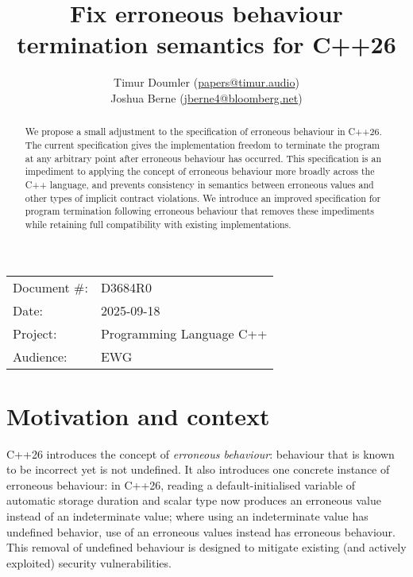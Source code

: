 

 \usepackage[bottom]{footmisc} 



\title{Fix erroneous behaviour termination semantics for C++26}
\author{
  Timur Doumler \small(\href{mailto:papers@timur.audio}{papers@timur.audio}) \\
  Joshua Berne \small(\href{mailto:jberne4@bloomberg.net}{jberne4@bloomberg.net}) 
}
\date{}
\maketitle

\begin{tabular}{ll}
Document \#: & D3684R0 \\
Date: &2025-09-18 \\
Project: & Programming Language C++ \\
Audience: & EWG
\end{tabular}

\begin{abstract}
We propose a small adjustment to the specification of erroneous behaviour in C++26. The current specification gives the implementation  freedom to terminate the program at any arbitrary point after erroneous behaviour has occurred. This specification is an impediment to applying the concept of erroneous behaviour more broadly across the C++ language, and prevents consistency in semantics between erroneous values and other types of implicit contract violations. We introduce an improved specification for program termination following erroneous behaviour that removes these impediments while retaining full compatibility with existing implementations.
\end{abstract}


\section{Motivation and context}

C++26 introduces the concept of \emph{erroneous behaviour}: behaviour that is known to be incorrect yet is not undefined. It also introduces one concrete instance of erroneous behaviour: in C++26, reading a default-initialised variable of automatic storage duration and scalar type now produces an erroneous value instead of an indeterminate value; where using an indeterminate value has undefined behavior, use of an erroneous values instead has erroneous behaviour. This removal of undefined behaviour is designed to mitigate existing (and actively exploited) security vulnerabilities.

